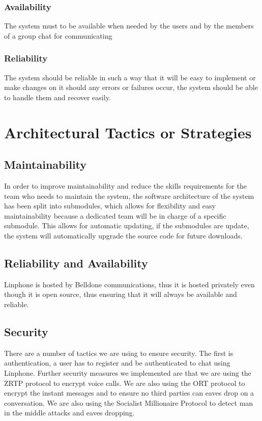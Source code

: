 \documentclass[a4paper]{article}
\begin{document}
\subsubsection{Availability}
The system must to be available when needed by the users and by the members of a group chat for communicating\\

\subsubsection{Reliability}
The system should be reliable in such a way that it will be easy to implement or make changes on it should any errors or failures occur, the system should be able to handle them and recover easily.\\	
	

\section{\textbf{Architectural Tactics or Strategies}}

\subsection{Maintainability}

In order to improve maintainability and reduce the skills requirements for the team who needs to maintain the system, the software architecture of the system has been split into submodules, which allows for flexibility and easy maintainability because a dedicated team will be in charge of a specific submodule. This allows for automatic updating, if the submodules are update, the system will automatically upgrade the source code for future downloads.

\subsection{Reliability and Availability}

Linphone is hosted by Belldone communications, thus it is hosted privately even though it is open source, thus ensuring that it will always be available and reliable.

\subsection{Security}

There are a number of tactics we are using to ensure security. The first is authentication, a user has to register and be authenticated to chat using Linphone. Further security measures we implemented are that we are using the ZRTP protocol to encrypt voice calls. We are also using the ORT protocol to encrypt the instant messages and to ensure no third parties can eaves drop on a conversation. We are also using the Socialist Millionaire Protocol to detect man in the middle attacks and eaves dropping.
\end{document}
